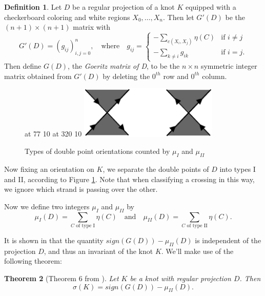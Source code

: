 \documentclass[11pt]{article}
\theoremstyle{plain} \newtheorem{thm}{Theorem}[subsection]
\theoremstyle{plain} \newtheorem{cor}[thm]{Corollary}
\theoremstyle{plain} \newtheorem{prop}[thm]{Proposition}
\theoremstyle{plain} \newtheorem{conj}[thm]{Conjecture}
\theoremstyle{plain} \newtheorem{lem}[thm]{Lemma}
\theoremstyle{definition} \newtheorem{df}[thm]{Definition}
\theoremstyle{remark} \newtheorem{rmk}[thm]{Remark}
\theoremstyle{remark} \newtheorem{obs}[thm]{Observation}
\numberwithin{equation}{section}
\begin{document}
\begin{df}\label{goeritzdef}
Let $D$ be a regular projection of a knot $K$ equipped with a checkerboard coloring and white regions $X_{0}, \ldots, X_{n}$.  Then let $G'(D)$ be the $(n+1) \times (n+1)$ matrix with
\begin{equation*}
G'(D) = \left(g_{ij}\right)_{i,j = 0}^{n}, \quad \text{where} \quad
g_{ij} = 
\begin{cases} 
-\displaystyle\sum_{c(X_{i},X_{j})}\eta(C)& \text{if $i \neq j$}\\ 
-\displaystyle\sum_{k \neq i}g_{ik} & \text{if $i = j$} .
\end{cases}
\end{equation*}
Then define $G(D)$, the \textit{Goeritz matrix of D}, to be the $n \times n$ symmetric integer matrix obtained from $G'(D)$ by deleting the $0^{th}$ row and $0^{th}$ column.
\end{df}

\begin{figure}[h]
\centering
\begin{minipage}[c]{.45\linewidth}
\small
{} at 77 10
 at 320 10
\endlabellist
\includegraphics[height = 25mm]{crossingorient}\end{minipage}
\begin{minipage}[c]{.45\linewidth}
\caption{Types of double point orientations counted by $\mu_{I}$ and $\mu_{II}$\label{fig:crossingorient}}
\end{minipage}
\end{figure}

Now fixing an orientation on $K$, we separate the double points of $D$ into types I and II, according to Figure \ref{fig:crossingorient}.  Note that when classifying a crossing in this way, we ignore which strand is passing over the other.

Now we define two integers $\mu_{I}$ and $\mu_{II}$ by
\begin{equation*}
\mu_{I}(D) = \displaystyle\sum_{C \text{ of type I}} \eta(C) \quad \text{and} \quad \mu_{II}(D) = \displaystyle\sum_{C \text{ of type II}} \eta(C).
\end{equation*}

It is shown in \cite{gl:sig} that the quantity $sign(G(D)) - \mu_{II}(D)$ is independent of the projection $D$, and thus an invariant of the knot $K$.  We'll make use of the following theorem:
\begin{thm}[Theorem $6$ from \cite{gl:sig}]\label{GLthm}
Let $K$ be a knot with regular projection $D$.  Then
\begin{equation*}
\sigma(K) = sign(G(D)) - \mu_{II}(D).
\end{equation*}
\end{thm}
\end{document}
